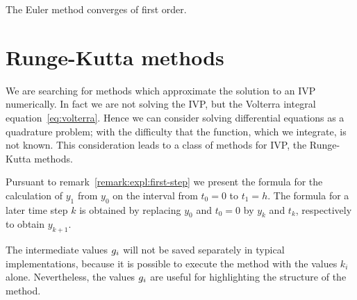 \begin{corollary}
  The Euler method converges of first order.
\end{corollary}

\section{Runge-Kutta methods}

\begin{intro}
  We are searching for methods which approximate the solution to an
  IVP numerically.  In fact we are not solving the IVP, but the Volterra
  integral equation~\eqref{eq:volterra}.  Hence we can consider
  solving differential equations as a quadrature problem; with the
  difficulty that the function, which we integrate, is not known. This
  consideration leads to a class of methods for IVP, the
  Runge-Kutta methods.
\end{intro}



\begin{remark}
  Pursuant to remark~\ref{remark:expl:first-step} we present the
  formula for the calculation of $y_1$ from $y_0$ on the interval from
  $t_0=0$ to $t_1 = h$.  The formula for a later time step $k$ is
  obtained by replacing $y_0$ and $t_0=0$ by $y_k$ and $t_k$,
  respectively to obtain $y_{k+1}$.
\end{remark}

\begin{remark}
  The intermediate values $g_i$ will not be saved separately in
  typical implementations, because it is possible to execute the
  method with the values $k_i$ alone. Nevertheless, the values
  $g_i$ are useful for highlighting the structure of the method.
\end{remark}



